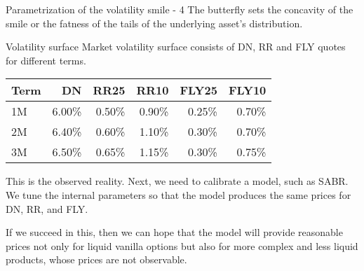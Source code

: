 \documentclass{beamer}
\begin{document}
\begin{frame}{Parametrization of the volatility smile - 4}
\justify
The butterfly sets the concavity of the smile or the fatness of the tails of the underlying asset's distribution.

\centering
{}
\end{frame}



\begin{frame}{Volatility surface}
\justify
Market volatility surface consists of DN, RR and FLY quotes for different terms.

\justify
\centering
\begin{tabular}{l|r|r|r|r|r}
Term & DN     & RR25   & RR10   & FLY25  & FLY10  \\ \hline
1M   & 6.00\% & 0.50\% & 0.90\% & 0.25\% & 0.70\% \\
2M   & 6.40\% & 0.60\% & 1.10\% & 0.30\% & 0.70\% \\
3M   & 6.50\% & 0.65\% & 1.15\% & 0.30\% & 0.75\% 
\end{tabular}

\justify
This is the observed reality. Next, we need to calibrate a model, such as SABR. We tune the internal parameters so that the model produces the same prices for DN, RR, and FLY.

\justify
If we succeed in this, then we can hope that the model will provide reasonable prices not only for liquid vanilla options but also for more complex and less liquid products, whose prices are not observable.
\end{frame}
\end{document}
